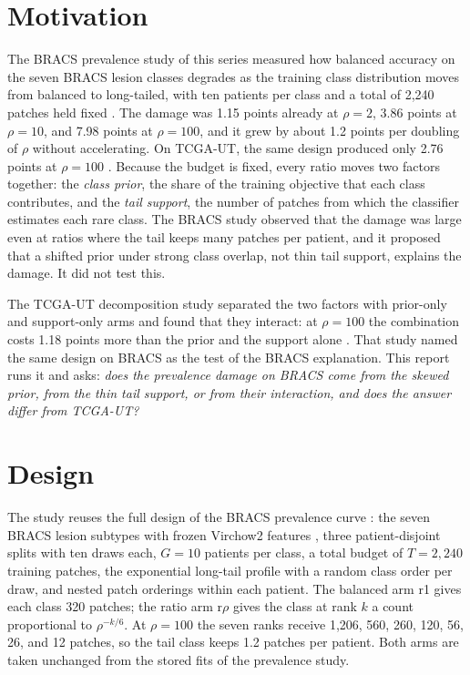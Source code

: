 \documentclass[11pt]{article}
\begin{document}
\section{Motivation}
\label{sec:motivation}
The BRACS prevalence study of this series measured how balanced accuracy on the seven BRACS lesion classes degrades as the training class distribution moves from balanced to long-tailed, with ten patients per class and a total of 2,240 patches held fixed \citep{queisler2026prevalenceBracs}. The damage was 1.15 points already at $\rho=2$, 3.86 points at $\rho=10$, and 7.98 points at $\rho=100$, and it grew by about 1.2 points per doubling of $\rho$ without accelerating. On TCGA-UT, the same design produced only 2.76 points at $\rho=100$ \citep{queisler2026prevalenceTcga}. Because the budget is fixed, every ratio moves two factors together: the \emph{class prior}, the share of the training objective that each class contributes, and the \emph{tail support}, the number of patches from which the classifier estimates each rare class. The BRACS study observed that the damage was large even at ratios where the tail keeps many patches per patient, and it proposed that a shifted prior under strong class overlap, not thin tail support, explains the damage. It did not test this.

The TCGA-UT decomposition study separated the two factors with prior-only and support-only arms and found that they interact: at $\rho=100$ the combination costs 1.18 points more than the prior and the support alone \citep{queisler2026causeTcga}. That study named the same design on BRACS as the test of the BRACS explanation. This report runs it and asks: \emph{does the prevalence damage on BRACS come from the skewed prior, from the thin tail support, or from their interaction, and does the answer differ from TCGA-UT?}

\section{Design}
\label{sec:design}
The study reuses the full design of the BRACS prevalence curve \citep{queisler2026prevalenceBracs}: the seven BRACS lesion subtypes with frozen Virchow2 features \citep{zimmermann2024virchow2}, three patient-disjoint splits with ten draws each, $G=10$ patients per class, a total budget of $T=2{,}240$ training patches, the exponential long-tail profile with a random class order per draw, and nested patch orderings within each patient. The balanced arm r1 gives each class 320 patches; the ratio arm r$\rho$ gives the class at rank $k$ a count proportional to $\rho^{-k/6}$. At $\rho=100$ the seven ranks receive 1,206, 560, 260, 120, 56, 26, and 12 patches, so the tail class keeps 1.2 patches per patient. Both arms are taken unchanged from the stored fits of the prevalence study.
\end{document}
